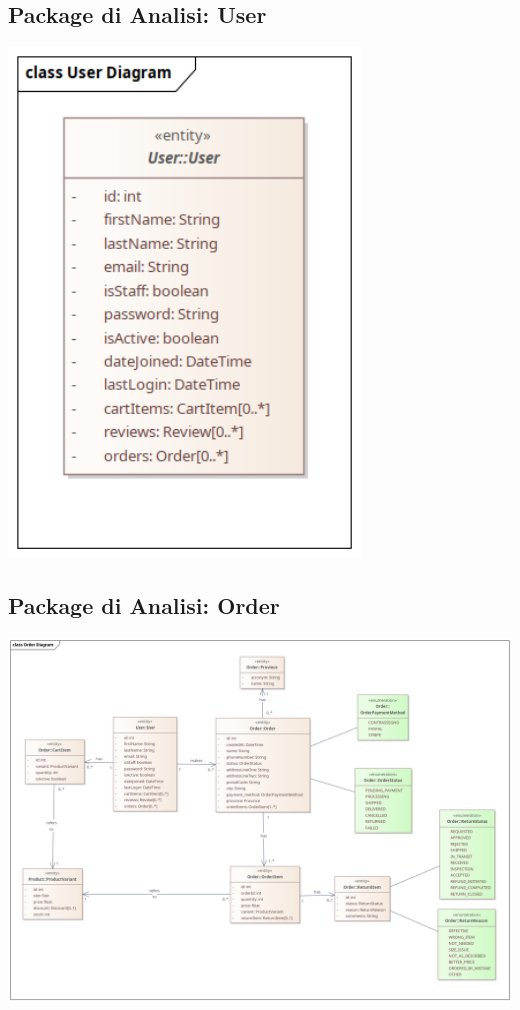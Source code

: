 \subsection{Package di Analisi: User}
\begin{center}
  \includegraphics[width=0.7\textwidth]{immagini/Analisi/ClassDiagrams/User.png}
\end{center}

\subsection{Package di Analisi: Order}
\begin{center}
  \includegraphics[width=\textwidth]{immagini/Analisi/ClassDiagrams/Order.png}
\end{center}

